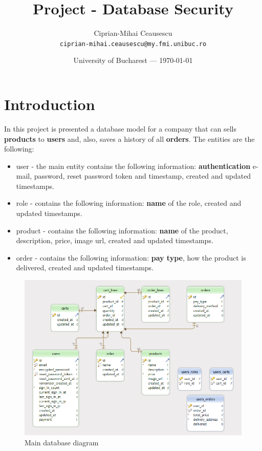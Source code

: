 \documentclass{article}
\title{Project - Database Security} %
\author{Ciprian-Mihai Ceausescu\\ \texttt{ciprian-mihai.ceausescu@my.fmi.unibuc.ro}} %
\date{University of Bucharest --- \today} %
\begin{document}
\maketitle %


\section*{Introduction}
\hspace{10mm}In this project is presented a database model for a company that can sells \textbf{products} to \textbf{users} and, also, saves a history of all \textbf{orders}. The entities are the following:
\begin{itemize}
\item user -  the main entity contains the following information: \textbf{authentication} e-mail, password, reset password token and timestamp, created and updated timestamps.
\item role - contains the following information: \textbf{name} of the role, created and updated timestamps.
\item product -  contains the following information: \textbf{name} of the product, description, price, image url, created and updated timestamps.
\item order - contains the following information: \textbf{pay type}, how the product is delivered, created and updated timestamps.
\end{itemize}
\begin{figure}
\centering
\includegraphics[scale=0.8]{Schema_1}
\caption{Main database diagram}
\end{figure}
\end{document}
